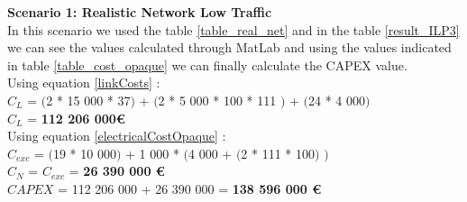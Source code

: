 \textbf{Scenario 1: Realistic Network Low Traffic} \label{Scenario3_opaque_p} \\

In this scenario we used the table \ref{table_real_net} and in the table \ref{result_ILP3} we can see the values calculated through MatLab and using the values indicated in table \ref{table_cost_opaque} we can finally calculate the CAPEX value.\\

Using equation \ref{linkCosts} : \\
$C_L$ = $($2 * 15 000 * 37$)$ + $($2 * 5 000 * 100 * 111 $)$ + $($24 * 4 000$)$ \\
$C_L$ = \textbf{112 206 000\euro} \\

Using equation \ref{electricalCostOpaque} : \\
$C_{exc}$ = $($19 * 10 000$)$ + 1 000 * $($4 000 + $($2 * 111 * 100$)$ $)$ \\
$C_N$ = $C_{exc}$ = \textbf{26 390 000 \euro} \\

$CAPEX$ = 112 206 000 + 26 390 000 = \textbf{138 596 000 \euro}\\

